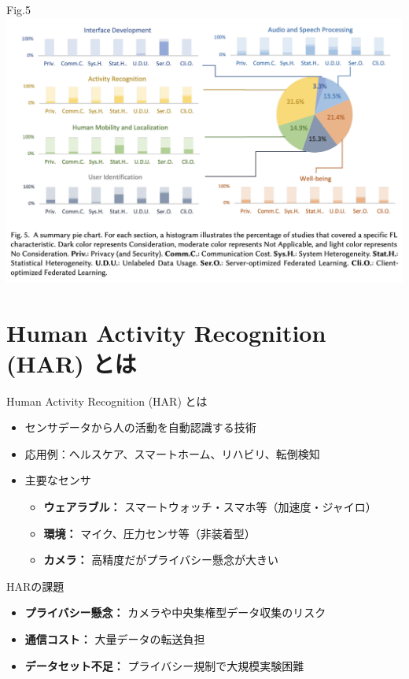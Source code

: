 \documentclass[unicode,12pt,aspectratio=169,dvipdfmx]{beamer}
\begin{document}
\begin{frame}{Fig.5}
    \center \includegraphics[scale=0.3]{figures/domain_per.png}                    
\end{frame}


\section{Human Activity Recognition (HAR) とは}

\begin{frame}{Human Activity Recognition (HAR) とは}
  \begin{itemize}
    \item センサデータから人の活動を自動認識する技術
    \item 応用例：ヘルスケア、スマートホーム、リハビリ、転倒検知
    \item 主要なセンサ
      \begin{itemize}
        \item \textbf{ウェアラブル：} スマートウォッチ・スマホ等（加速度・ジャイロ）
        \item \textbf{環境：} マイク、圧力センサ等（非装着型）
        \item \textbf{カメラ：} 高精度だがプライバシー懸念が大きい
      \end{itemize}
  \end{itemize}
\end{frame}

\begin{frame}{HARの課題}
  \begin{itemize}
    \item \textbf{プライバシー懸念：} カメラや中央集権型データ収集のリスク
    \item \textbf{通信コスト：} 大量データの転送負担
    \item \textbf{データセット不足：} プライバシー規制で大規模実験困難
  \end{itemize}
\end{frame}
\end{document}
